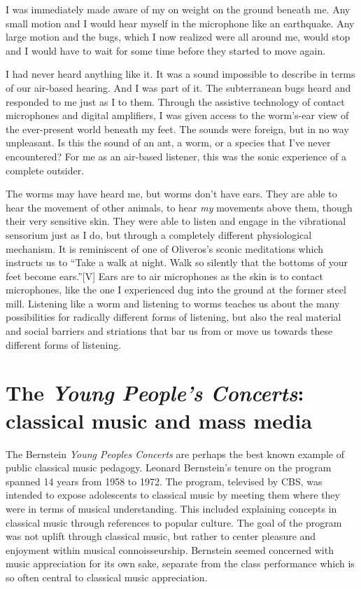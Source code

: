 \documentclass[12pt,letterpaper]{article}
\begin{document}
	I was immediately made aware of my on weight on the ground beneath me. 
	Any small motion and I would hear myself in the microphone like an 
	earthquake. Any large motion and the bugs, which I now realized were all
	around me, would stop and I would have to wait for some time before they
	started to move again. 

	I had never heard anything like it. It was a sound impossible to 
	describe in terms of our air-based hearing. And I was part of it. The 
	subterranean bugs heard and responded to me just as I to them. Through 
	the assistive technology of contact microphones and digital amplifiers, 
	I was given access to the worm's-ear view of the ever-present world 
	beneath my feet. The sounds were foreign, but in no way unpleasant. Is 
	this the sound of an ant, a worm, or a species that I've never 
	encountered? For me as
	an air-based listener, this was the sonic experience of a complete 
	outsider.	

	The worms may have heard me, but worms don't have ears. They are able 
	to hear the movement of other 
	animals, to hear \textit{my} movements above them, though their very
	sensitive skin. They were able to listen and engage in the vibrational
	sensorium just as I do, but through a completely different physiological
	mechanism. It is reminiscent of one of Oliveros's sconic meditations 
	which instructs us to ``Take a walk at night. Walk so silently that the
	bottoms of your feet become ears.''\autocite{Oliveros}[V] Ears are to air
	microphones as the skin is to contact microphones, like the one I 
	experienced dug into the ground at the former steel mill. Listening
	like a worm and listening to worms teaches us about the many 
	possibilities for radically different forms of listening, but also the
	real material and social barriers and striations that bar us from or 
	move us towards these different forms of listening.
		
	\section*{The \textit{Young People's Concerts}: classical music and 
	mass media}

	\noindent The Bernstein \textit{Young Peoples Concerts} are perhaps the
	best known example of public classical music pedagogy. Leonard 
	Bernstein's tenure
	on the program spanned 14 years from 1958 to 1972. The program, televised by
	CBS, was intended to expose adolescents to classical music by meeting 
	them where they were in terms of musical understanding. This included  
	explaining concepts in classical music through references to popular 
	culture. The goal of the program was not uplift through classical
	music, but rather to center pleasure and enjoyment within musical 
	connoisseurship. Bernstein seemed concerned with music appreciation 
	for its own sake, separate from the class performance which is so often
	central to classical music appreciation.      
\end{document}
